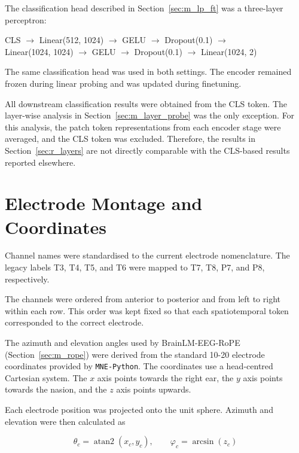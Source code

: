 The classification head described in Section~\ref{sec:m_lp_ft} was a
three-layer perceptron:

\begin{center}
CLS \(\rightarrow\) Linear(512, 1024) \(\rightarrow\) GELU \(\rightarrow\)
Dropout(0.1) \(\rightarrow\)\\
Linear(1024, 1024) \(\rightarrow\) GELU \(\rightarrow\) Dropout(0.1)
\(\rightarrow\) Linear(1024, 2)
\end{center}

The same classification head was used in both settings.
The encoder remained frozen during linear probing and was updated during finetuning.

All downstream classification results were obtained from the CLS token.
The layer-wise analysis in Section~\ref{sec:m_layer_probe} was the only
exception. For this analysis, the patch token representations from each
encoder stage were averaged, and the CLS token was excluded. Therefore,
the results in Section~\ref{sec:r_layers} are not directly comparable with
the CLS-based results reported elsewhere.

\section{Electrode Montage and Coordinates}\label{app:montage}

Channel names were standardised to the current electrode nomenclature.
The legacy labels T3, T4, T5, and T6 were mapped to T7, T8, P7, and P8,
respectively.

The channels were ordered from anterior to posterior and from left to right
within each row. This order was kept fixed so that each spatiotemporal token
corresponded to the correct electrode.

The azimuth and elevation angles used by BrainLM-EEG-RoPE
(Section~\ref{sec:m_rope}) were derived from the standard 10-20 electrode
coordinates provided by \texttt{MNE-Python}. The coordinates use a
head-centred Cartesian system. The \(x\) axis points towards the right ear,
the \(y\) axis points towards the nasion, and the \(z\) axis points upwards.

Each electrode position was projected onto the unit sphere. Azimuth and
elevation were then calculated as

\begin{equation}
    \theta_c = \operatorname{atan2}(x_c, y_c),
    \qquad
    \varphi_c = \arcsin(z_c)
    \label{eq:app_rope_angles}
\end{equation}

